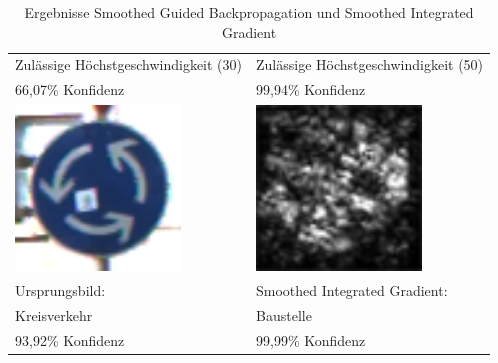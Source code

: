 \begin{table}
\begin{tabular}{p{8cm}p{8cm}}
		Zulässige Höchstgeschwindigkeit (30) & Zulässige Höchstgeschwindigkeit (50)\\
		66,07\% Konfidenz & 99,94\% Konfidenz\\
		\includegraphics[height=4.4cm]{Images/AnPe/5_2_Unten_links} &\includegraphics[height=4.4cm]{Images/AnPe/5_2_Unten_rechts}  \\
		Ursprungsbild: & Smoothed Integrated Gradient:\\
		Kreisverkehr & Baustelle\\
		93,92\% Konfidenz & 99,99\% Konfidenz\\
	\end{tabular}
	\caption{Ergebnisse Smoothed Guided Backpropagation und Smoothed Integrated Gradient}
\label{tab:sal2}
\end{table}



